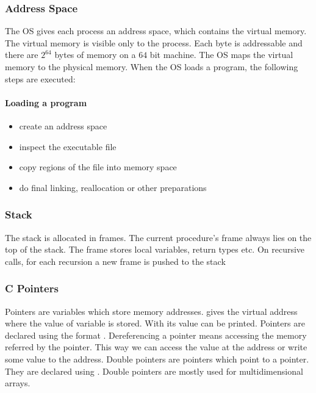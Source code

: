 

\subsubsection{Address Space}
The OS gives each process an address space, which contains the virtual memory. The virtual memory is visible only to the process. Each byte is addressable and there are $2^{64}$ bytes of memory on a $64$ bit machine. The OS maps the virtual memory to the physical memory.
When the OS loads a program, the following steps are executed:

\paragraph{Loading a program}
\begin{itemize}
    \item create an address space
    \item inspect the executable file
    \item copy regions of the file into memory space
    \item do final linking, reallocation or other preparations
\end{itemize}

\subsubsection{Stack}
The stack is allocated in frames. The current procedure's frame always lies on the top of the stack. The frame stores local variables, return types etc. On recursive calls, for each recursion a new frame is pushed to the stack

\subsubsection{C Pointers}
Pointers are variables which store memory addresses.  gives the virtual address where the value of variable  is stored. With  its value can be printed. Pointers are declared using the format . Dereferencing a pointer means accessing the memory referred by the pointer. This way we can access the value at the address or write some value to the address. Double pointers are pointers which point to a pointer. They are declared using . Double pointers are mostly used for multidimensional arrays.


